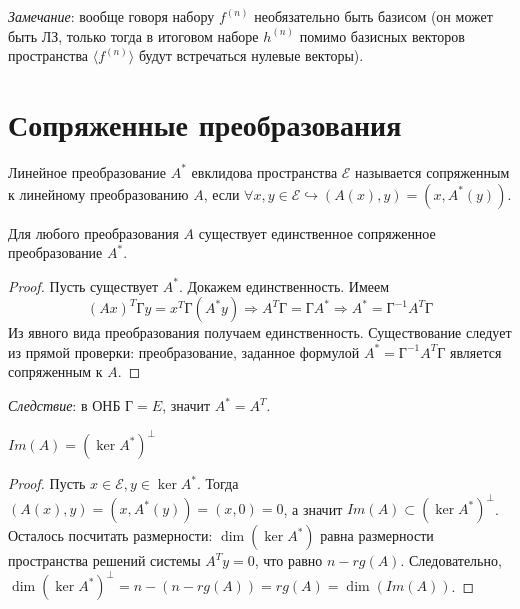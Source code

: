 \textit{Замечание}: вообще говоря набору $f^{(n)}$ необязательно быть базисом (он может быть ЛЗ, только тогда в итоговом наборе $h^{(n)}$ помимо базисных векторов пространства $\langle f^{(n)}\rangle$ будут встречаться нулевые векторы).

\section{Сопряженные преобразования}
\begin{definition}
    Линейное преобразование $A^*$ евклидова пространства $\mathcal{E}$ называется сопряженным к линейному преобразованию $A$, если $\forall x, y \in \mathcal{E} \hookrightarrow(A(x),y)=(x, A^*(y))$.
\end{definition}
\begin{theorem}
    Для любого преобразования $A$ существует единственное сопряженное преобразование $A^*$.
\end{theorem}
\begin{proof}
    Пусть существует $A^*$. Докажем единственность. Имеем 
    \[
    (Ax)^T\text{Г}y=x^T\text{Г}(A^*y) \Rightarrow A^T\text{Г}=\text{Г}A^* \Rightarrow A^*=\text{Г}^{-1}A^T\text{Г}
    \]
    Из явного вида преобразования получаем единственность. Существование следует из прямой проверки: преобразование, заданное формулой $A^*=\text{Г}^{-1}A^T\text{Г}$ является сопряженным к $A$.
\end{proof}

\textit{Следствие}: в ОНБ $\text{Г}=E$, значит $A^*=A^T$.

\begin{theorem}
    $Im(A)=(\ker A^*)^{\bot}$
\end{theorem}
\begin{proof}
    Пусть $x\in \mathcal{E}, y\in \ker A^*$. Тогда $(A(x),y)=(x, A^*(y))=(x,0)=0$, а значит $Im(A)\subset (\ker A^*)^{\bot}$. Осталось посчитать размерности: $\dim (\ker A^*)$ равна размерности пространства решений системы $A^Ty=0$, что равно $n-rg(A)$. Следовательно, $\dim (\ker A^*)^{\bot}=n-(n-rg(A))=rg(A)=\dim (Im(A))$.
\end{proof}